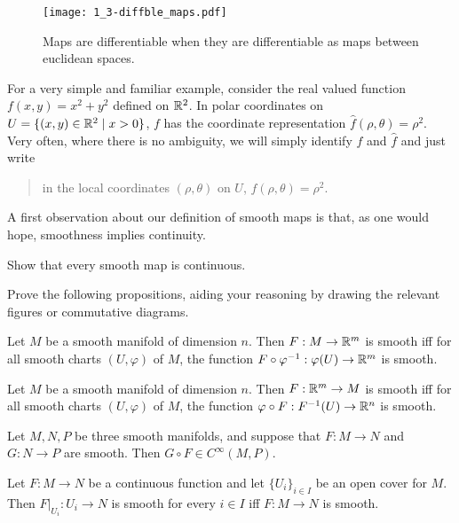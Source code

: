 \begin{figure}[htp]
  \centering
  \texttt{[image: 1\_3-diffble\_maps.pdf]}
  \caption{Maps are differentiable when they are differentiable as maps between euclidean spaces.}
  \label{fig:1.3-differentiable_maps}
\end{figure}

For a very simple and familiar example, consider the real valued function $f(x,y)= x^2+y^2$ defined on $\mathbb{R}^2$.
In polar coordinates on $U=\{(x,y)\in\mathbb{R}^2\mid x>0\}$, $f$ has the coordinate representation $\hat f (\rho, \theta) = \rho^2$.
Very often, where there is no ambiguity, we will simply identify $f$ and $\hat f$ and just write
\begin{quote}
  in the local coordinates $(\rho,\theta)$ on $U$, $f(\rho,\theta) = \rho^2$.
\end{quote}

A first observation about our definition of smooth maps is that, as one would hope, smoothness implies continuity.
%
\begin{exercise}
  Show that every smooth map is continuous.
\end{exercise}
%
\begin{exercise}
  Prove the following propositions, aiding your reasoning by drawing the relevant figures or commutative diagrams.
  \begin{proposition}
    Let $M$ be a smooth manifold of dimension $n$.
    Then $F:M\to\mathbb{R}^m$ is smooth iff for all smooth charts $(U,\varphi)$ of $M$, the function $F\circ\varphi^{-1}:\varphi(U)\to\mathbb{R}^m$ is smooth.
  \end{proposition}
  \begin{proposition}
    Let $M$ be a smooth manifold of dimension $n$.
    Then $F:\mathbb{R}^m\to M$ is smooth iff for all smooth charts $(U,\varphi)$ of $M$, the function $\varphi\circ F:F^{-1}(U)\to\mathbb{R}^n$ is smooth.
  \end{proposition}
  \begin{proposition}
    Let $M, N, P$ be three smooth manifolds, and suppose that $F:M\to N$ and $G:N\to P$ are smooth.
    Then $G\circ F\in C^\infty(M, P)$.
  \end{proposition}

  \begin{proposition}\label{prop:smoothlocal}
    Let $F:M\to N$ be a continuous function and let $\{U_i\}_{i\in I}$ be an open cover for $M$. Then $F|_{U_i}:U_i \to N$ is smooth for every $i\in I$ iff $F:M\to N$ is smooth.
  \end{proposition}
\end{exercise}

